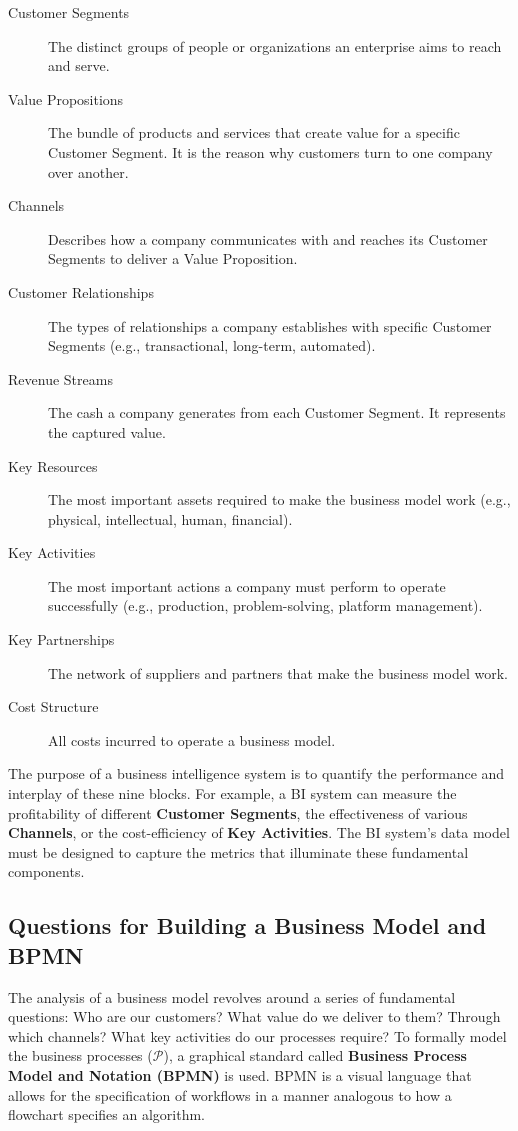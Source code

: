 \begin{description}
    \item[Customer Segments] The distinct groups of people or organizations an enterprise aims to reach and serve.
    \item[Value Propositions] The bundle of products and services that create value for a specific Customer Segment. It is the reason why customers turn to one company over another.
    \item[Channels] Describes how a company communicates with and reaches its Customer Segments to deliver a Value Proposition.
    \item[Customer Relationships] The types of relationships a company establishes with specific Customer Segments (e.g., transactional, long-term, automated).
    \item[Revenue Streams] The cash a company generates from each Customer Segment. It represents the captured value.
    \item[Key Resources] The most important assets required to make the business model work (e.g., physical, intellectual, human, financial).
    \item[Key Activities] The most important actions a company must perform to operate successfully (e.g., production, problem-solving, platform management).
    \item[Key Partnerships] The network of suppliers and partners that make the business model work.
    \item[Cost Structure] All costs incurred to operate a business model.
\end{description}

The purpose of a business intelligence system is to quantify the performance and interplay of these nine blocks. For example, a BI system can measure the profitability of different \textbf{Customer Segments}, the effectiveness of various \textbf{Channels}, or the cost-efficiency of \textbf{Key Activities}. The BI system's data model must be designed to capture the metrics that illuminate these fundamental components.

\subsection{Questions for Building a Business Model and BPMN}
The analysis of a business model revolves around a series of fundamental questions: Who are our customers? What value do we deliver to them? Through which channels? What key activities do our processes require?
To formally model the business processes ($\mathcal{P}$), a graphical standard called \textbf{Business Process Model and Notation (BPMN)} is used. BPMN is a visual language that allows for the specification of workflows in a manner analogous to how a flowchart specifies an algorithm.

